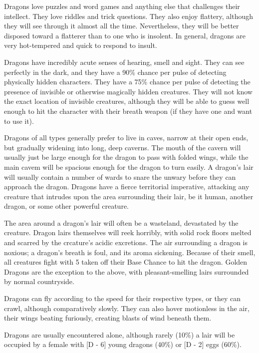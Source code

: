 \begin{multicols}{2}
Dragons love puzzles and word games and anything else that challenges
their intellect.  They love riddles and trick questions.  They also
enjoy flattery, although they will see through it almost all the
time. Nevertheless, they will be better disposed toward a flatterer
than to one who is insolent.  In general, dragons are very
hot-tempered and quick to respond to insult.

Dragons have incredibly acute senses of hearing, smell and sight. They
can see perfectly in the dark, and they have a 90\% chance per pulse of
detecting physically hidden characters.  They have a 75\% chance per
pulse of detecting the presence of invisible or otherwise magically
hidden creatures.  They will not know the exact location of invisible
creatures, although they will be able to guess well enough to hit the
character with their breath weapon (if they have one and want to use
it).

Dragons of all types generally prefer to live in caves, narrow at
their open ends, but gradually widening into long, deep caverns.  The
mouth of the cavern will usually just be large enough for the dragon
to pass with folded wings, while the main cavem will be spacious
enough for the dragon to turn easily.  A dragon's lair will usually
contain a number of wards to snare the unwary before they can approach
the dragon.  Dragons have a fierce territorial imperative, attacking
any creature that intrudes upon the area surrounding their lair, be it
human, another dragon, or some other powerful creature.

The area around a dragon's lair will often be a wasteland, devastated
by the creature.  Dragon lairs themselves will reek horribly, with
solid rock floors melted and scarred by the crcature's acidic
excretions.  The air surrounding a dragon is noxious; a dragon's
breath is foul, and its aroma sickening.  Because of their smell, all
creatures fight with 5 taken off their Base Chance to hit the dragon.
Golden Dragons are the exception to the above, with pleasant-smelling
lairs surrounded by normal countryside.

Dragons can fly according to the speed for their respective types, or
they can crawl, although comparatively slowly.  They can also hover
motionless in the air, their wings beating furiously, creating blasts
of wind beneath them.

Dragons are usually encountered alone, although rarely (10\%) a lair
will be occupied by a female with [D - 6] young dragons (40\%) or [D -
2] eggs (60\%).


\end{multicols}
